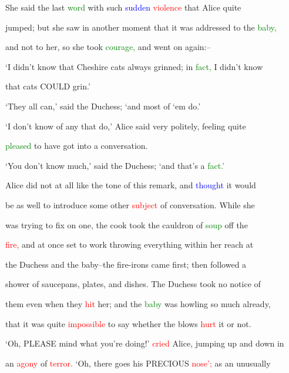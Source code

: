  She said the last \textcolor{green}{word} with such \textcolor{blue}{sudden} \textcolor{red}{violence} that Alice quite

 jumped; but she saw in another moment that it was addressed to the \textcolor{green}{baby,}

 and not to her, so she took \textcolor{green}{courage,} and went on again:--



 ‘I didn’t know that Cheshire cats always \textcolor{BurntOrange}{grinned;} in \textcolor{green}{fact,} I didn’t know

 that cats COULD \textcolor{BurntOrange}{grin.’}



 ‘They all can,’ said the Duchess; ‘and most of ‘em do.’



 ‘I don’t know of any that do,’ Alice said very politely, feeling quite

 \textcolor{green}{pleased} to have got into a conversation.



 ‘You don’t know much,’ said the Duchess; ‘and that’s a \textcolor{green}{fact.’}



 Alice did not at all like the tone of this remark, and \textcolor{blue}{thought} it would

 be as well to introduce some other \textcolor{red}{subject} of conversation. While she

 was trying to fix on one, the cook took the cauldron of \textcolor{green}{soup} off the

 \textcolor{red}{fire,} and at once set to work throwing everything within her reach at

 the Duchess and the baby--the fire-irons came first; then followed a

 shower of saucepans, plates, and dishes. The Duchess took no notice of

 them even when they \textcolor{red}{hit} her; and the \textcolor{green}{baby} was \textcolor{BurntOrange}{howling} so much already,

 that it was quite \textcolor{red}{impossible} to say whether the blows \textcolor{red}{hurt} it or not.



 ‘Oh, PLEASE mind what you’re doing!’ \textcolor{red}{cried} Alice, jumping up and down in

 an \textcolor{red}{agony} of \textcolor{red}{terror.} ‘Oh, there goes his \textcolor{BurntOrange}{PRECIOUS} \textcolor{red}{nose’;} as an unusually

